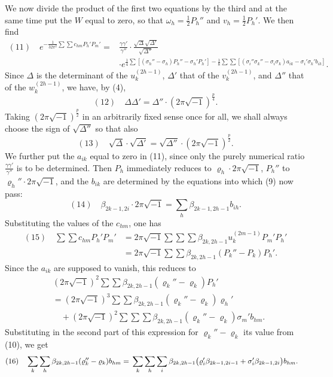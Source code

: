 \documentclass[10pt]{article}
\begin{document}
We now divide the product of the first two equations by the third and at the same time put the \(W\) equal to zero, so that \(\omega_h=\frac12P_h''\) and \(v_h=\frac12P_h'\). We then find
\[
\begin{aligned}
(11)\quad
e^{-\frac{1}{32\pi^2}\sum\sum c_{hm}P_h'P_m'}
={}&\frac{\gamma\gamma'}{\gamma''}\cdot\frac{\sqrt\Delta\sqrt{\Delta'}}{\sqrt{\Delta''}}\\
&\cdot e^{\frac14\sum[(\sigma_h''-\sigma_h)P_h''-\sigma_h'P_h']
-\frac18\sum\sum[(\sigma_i''\sigma_k''-\sigma_i\sigma_k)a_{ik}-\sigma_i'\sigma_k'b_{ik}]}.
\end{aligned}
\]
Since \(\Delta\) is the determinant of the \(u_k^{(2h-1)}\), \(\Delta'\) that of the \(v_k^{(2h-1)}\), and \(\Delta''\) that of the \(w_k^{(2h-1)}\), we have, by (4),
\[
(12)\quad
\Delta\Delta'=\Delta''\cdot(2\pi\sqrt{-1})^{\frac p4}.
\]
Taking \((2\pi\sqrt{-1})^{\frac p2}\) in an arbitrarily fixed sense once for all, we shall always choose the sign of \(\sqrt{\Delta''}\) so that also
\[
(13)\quad
\sqrt\Delta\cdot\sqrt{\Delta'}=\sqrt{\Delta''}\cdot(2\pi\sqrt{-1})^{\frac p2}.
\]
We further put the \(a_{ik}\) equal to zero in (11), since only the purely numerical ratio \(\frac{\gamma\gamma'}{\gamma''}\) is to be determined. Then \(P_h\) immediately reduces to \(\varrho_h\cdot2\pi\sqrt{-1}\), \(P_h''\) to \(\varrho_h''\cdot2\pi\sqrt{-1}\), and the \(b_{ik}\) are determined by the equations into which (9) now pass:
\[
(14)\quad
\beta_{2k-1,2i}\cdot2\pi\sqrt{-1}=\sum_h\beta_{2k-1,2h-1}b_{ih}.
\]
Substituting the values of the \(c_{hm}\), one has
\[
\begin{aligned}
(15)\quad
\sum\sum c_{hm}P_h'P_m'
&=2\pi\sqrt{-1}\sum\sum\sum\beta_{2k,2h-1}u_k^{(2m-1)}P_m'P_h'\\
&=2\pi\sqrt{-1}\sum\sum\beta_{2k,2h-1}(P_k''-P_k)P_h'.
\end{aligned}
\]
Since the \(a_{ik}\) are supposed to vanish, this reduces to
\[
\begin{aligned}
&(2\pi\sqrt{-1})^2\sum\sum\beta_{2k,2h-1}(\varrho_k''-\varrho_k)P_h'\\
&=(2\pi\sqrt{-1})^3\sum\sum\beta_{2k,2h-1}(\varrho_k''-\varrho_k)\varrho_h'\\
&\quad+(2\pi\sqrt{-1})^2\sum\sum\sum\beta_{2k,2h-1}(\varrho_k''-\varrho_k)\sigma_m'b_{hm}.
\end{aligned}
\]
Substituting in the second part of this expression for \(\varrho_k''-\varrho_k\) its value from (10), we get
\[
\begin{aligned}
(16)\quad
\sum_k\sum_h\beta_{2k,2h-1}(\varrho_k''-\varrho_k)b_{hm}
={}&\sum_k\sum_h\sum_i\beta_{2k,2h-1}\bigl(\varrho_i'\beta_{2k-1,2i-1}\nobreak+\sigma_i'\beta_{2k-1,2i}\bigr)b_{hm}.
\end{aligned}
\]
\end{document}
